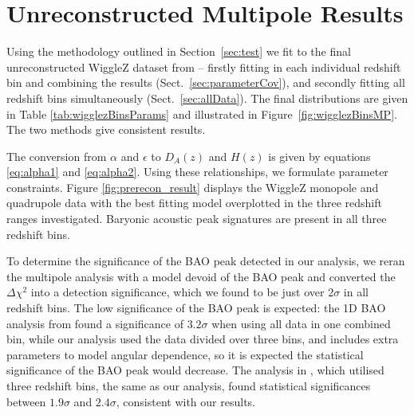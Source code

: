 \documentclass[a4paper,fleqn,usenatbib]{mnras}
\begin{document}
\section{Unreconstructed Multipole Results}
\label{sec:multi}

Using the methodology outlined in Section~\ref{sec:test} we fit to the final unreconstructed WiggleZ dataset from \citet{KazinKoda2014} -- firstly fitting in each individual redshift bin and combining the results (Sect.~\ref{sec:parameterCov}), and secondly fitting all redshift bins simultaneously (Sect.~\ref{sec:allData}). The final distributions are given in Table \ref{tab:wigglezBinsParams} and illustrated in Figure~\ref{fig:wigglezBinsMP}.  The two methods give consistent results. 


The conversion from $\alpha$ and $\epsilon$ to $D_A(z)$ and $H(z) $ is given by equations \eqref{eq:alpha1} and \eqref{eq:alpha2}. Using these relationships, we formulate parameter constraints. Figure \ref{fig:prerecon_result} displays the WiggleZ monopole and quadrupole data with the best fitting model overplotted in the three redshift ranges investigated. Baryonic acoustic peak signatures are present in all three redshift bins.

To determine the significance of the BAO peak detected in our analysis, we reran the multipole analysis with a model devoid of the BAO peak and converted the $\Delta \chi^2$ into a detection significance, which we found to be just over $2\sigma$ in all redshift bins. The low significance of the BAO peak is expected: the 1D BAO analysis from \citet{BlakeDavis2011} found a significance of $3.2\sigma$ when using all data in one combined bin, while our analysis used the data divided over three bins, and includes extra parameters to model angular dependence, so it is expected the statistical significance of the BAO peak would decrease. The analysis in \citet{BlakeKazin2011}, which utilised three redshift bins, the same as our analysis, found statistical significances between $1.9\sigma$ and $2.4\sigma$, consistent with our results.
\end{document}
